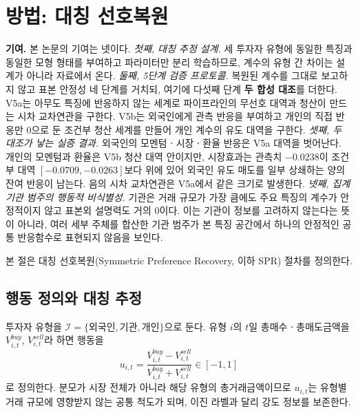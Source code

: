 %

\section{방법: 대칭 선호복원}
\label{sec:method}

\textbf{기여.} 본 논문의 기여는 넷이다. \emph{첫째, 대칭 추정 설계.} 세 투자자 유형에
동일한 특징과 동일한 모형 형태를 부여하고 파라미터만 분리 학습하므로, 계수의 유형 간
차이는 설계가 아니라 자료에서 온다. \emph{둘째, 5단계 검증 프로토콜.} 복원된 계수를
그대로 보고하지 않고 표본 안정성 네 단계를 거치되, 여기에 다섯째 단계
\textbf{두 합성 대조}를 더한다. V5a는 아무도 특징에 반응하지 않는 세계로 파이프라인의
무선호 대역과 청산이 만드는 시차 교차연관을 구한다. V5b는 외국인에게 관측 반응을 부여하고
개인의 직접 반응만 0으로 둔 조건부 청산 세계를 만들어 개인 계수의 유도 대역을 구한다.
\emph{셋째, 두 대조가 낳는 실증 결과.} 외국인의 모멘텀ㆍ시장ㆍ환율 반응은 V5a 대역을
벗어난다. 개인의 모멘텀과 환율은 V5b 청산 대역 안이지만, 시장효과는 관측치 $-0.0238$이
조건부 대역 $[-0.0709,-0.0263]$보다 위에 있어 외국인 유도 매도를 일부 상쇄하는 양의
잔여 반응이 남는다. 음의 시차 교차연관은 V5a에서 같은 크기로 발생한다.
\emph{넷째, 집계 기관 범주의 행동적 비식별성.} 기관은 거래 규모가 가장 큼에도 주요
특징의 계수가 안정적이지 않고 표본외 설명력도 거의 0이다. 이는 기관이 정보를 고려하지
않는다는 뜻이 아니라, 여러 세부 주체를 합산한 기관 범주가 본 특징 공간에서 하나의
안정적인 공통 반응함수로 표현되지 않음을 보인다.

본 절은 대칭 선호복원(Symmetric Preference Recovery, 이하 SPR) 절차를 정의한다.

\subsection{행동 정의와 대칭 추정}
\label{sec:setup}

투자자 유형을 $\mathcal{I}=\{\text{외국인},\text{기관},\text{개인}\}$으로 둔다. 유형
$i$의 $t$일 총매수ㆍ총매도금액을 $V^{buy}_{i,t}$, $V^{sell}_{i,t}$라 하면 행동을
\begin{equation}
u_{i,t}=\frac{V^{buy}_{i,t}-V^{sell}_{i,t}}{V^{buy}_{i,t}+V^{sell}_{i,t}}\in[-1,1]
\label{eq:action}
\end{equation}
로 정의한다. 분모가 시장 전체가 아니라 해당 유형의 총거래금액이므로 $u_{i,t}$는 유형별
거래 규모에 영향받지 않는 공통 척도가 되며, 이진 라벨과 달리 강도 정보를 보존한다.

